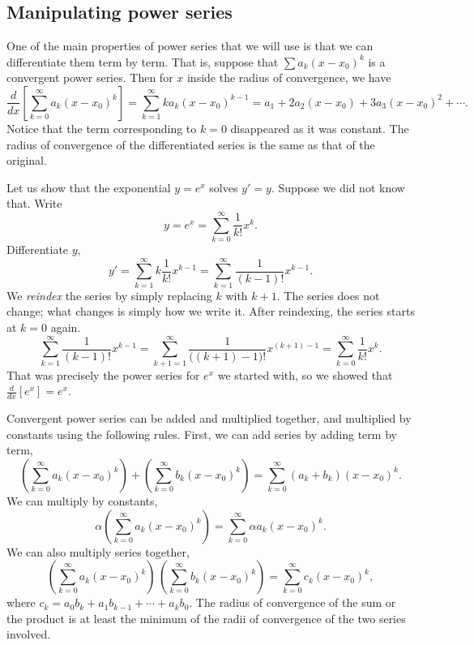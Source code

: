 \subsection{Manipulating power series}

One of the main properties of power series that we will use is
that we can differentiate them term by term.  That is,
suppose that 
$\sum a_k {(x-x_0)}^k$ is a convergent power series.  Then
for $x$ inside the radius of convergence, we have
\begin{equation*}
\frac{d}{dx}
\left[\sum_{k=0}^\infty a_k {(x-x_0)}^k\right]
=
\sum_{k=1}^\infty k a_k {(x-x_0)}^{k-1}
=
a_1
+ 2 a_2 (x-x_0)
+ 3 a_3 {(x-x_0)}^{2}
+ \cdots
.
\end{equation*}
Notice that the term corresponding to $k=0$ disappeared as
it was constant.  The radius of convergence of the differentiated
series is the same as that of the original.

\begin{example}
Let us show that the exponential $y=e^x$ solves $y'=y$.  Suppose
we did not know that.
Write
\begin{equation*}
y = e^x = \sum_{k=0}^\infty \frac{1}{k!} x^k .
\end{equation*}
Differentiate $y$,
\begin{equation*}
y' = \sum_{k=1}^\infty k \frac{1}{k!} x^{k-1} =
\sum_{k=1}^\infty \frac{1}{(k-1)!} x^{k-1} .
\end{equation*}
We \emph{reindex}
the series by simply replacing $k$ with $k+1$.  The series
does not change; what changes is simply how we write it.  After
reindexing, the series starts 
at $k=0$ again.
\begin{equation*}
\sum_{k=1}^\infty \frac{1}{(k-1)!} x^{k-1} =
\sum_{k+1=1}^\infty \frac{1}{\bigl((k+1)-1\bigr)!} x^{(k+1)-1} =
\sum_{k=0}^\infty \frac{1}{k!} x^k .
\end{equation*}
That was precisely the power series for $e^x$ we started with,
so we showed that $\frac{d}{dx} [ e^x ] = e^x$.
\end{example}

Convergent power series can be added and multiplied together, and multiplied
by constants using the following rules.  First, we can add series by
adding term by term,
\begin{equation*}
\left(\sum_{k=0}^\infty a_k {(x-x_0)}^k\right)
+
\left(\sum_{k=0}^\infty b_k {(x-x_0)}^k\right)
=
\sum_{k=0}^\infty (a_k+b_k) {(x-x_0)}^k .
\end{equation*}
We can multiply by constants,
\begin{equation*}
\alpha
\left(\sum_{k=0}^\infty a_k {(x-x_0)}^k\right)
=
\sum_{k=0}^\infty \alpha a_k {(x-x_0)}^k .
\end{equation*}
We can also multiply series together,
\begin{equation*}
\left(\sum_{k=0}^\infty a_k {(x-x_0)}^k\right)
\,
\left(\sum_{k=0}^\infty b_k {(x-x_0)}^k\right)
=
\sum_{k=0}^\infty c_k {(x-x_0)}^k ,
\end{equation*}
where
$c_k = a_0b_k + a_1 b_{k-1} + \cdots + a_k b_0$.
The radius of convergence of the sum or the product
is at least the minimum of the radii of convergence of
the two series involved.

